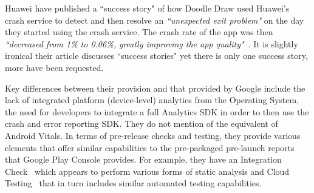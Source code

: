 Huawei have published a ``success story" of how Doodle Draw used Huawei's crash service to detect and then resolve an \emph{``unexpected exit problem"} on the day they started using the crash service. The crash rate of the app was then \emph{``decreased from 1\% to 0.06\%, greatly improving the app quality"}~\citep{huawei_agc_success_stories}. It is slightly ironical their article discusses ``success stories" yet there is only one success story, more have been requested.

Key differences between their provision and that provided by Google include the lack of integrated platform (device-level) analytics from the Operating System, the need for developers to integrate a full Analytics SDK in order to then use the crash and error reporting SDK. They do not mention of the equivalent of Android Vitals. In terms of pre-release checks and testing, they provide various elements that offer similar capabilities to the pre-packaged pre-launch reports that Google Play Console provides. For example, they have an Integration Check~\citep{huawei_appgallery_integration_check} which appears to perform various forms of static analysis and Cloud Testing~\citep{huawei_appgallery_cloud_testing} that in turn includes similar automated testing capabilities. 

